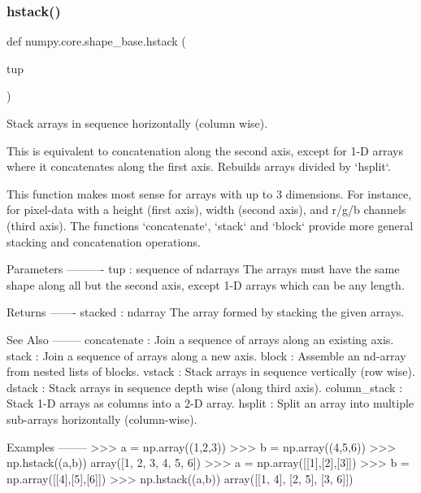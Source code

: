 \subsubsection{\texorpdfstring{hstack()}{hstack()}}
{\footnotesize\ttfamily def numpy.\+core.\+shape\+\_\+base.\+hstack (\begin{DoxyParamCaption}\item[{}]{tup }\end{DoxyParamCaption})}

\begin{DoxyVerb}Stack arrays in sequence horizontally (column wise).

This is equivalent to concatenation along the second axis, except for 1-D
arrays where it concatenates along the first axis. Rebuilds arrays divided
by `hsplit`.

This function makes most sense for arrays with up to 3 dimensions. For
instance, for pixel-data with a height (first axis), width (second axis),
and r/g/b channels (third axis). The functions `concatenate`, `stack` and
`block` provide more general stacking and concatenation operations.

Parameters
----------
tup : sequence of ndarrays
    The arrays must have the same shape along all but the second axis,
    except 1-D arrays which can be any length.

Returns
-------
stacked : ndarray
    The array formed by stacking the given arrays.

See Also
--------
concatenate : Join a sequence of arrays along an existing axis.
stack : Join a sequence of arrays along a new axis.
block : Assemble an nd-array from nested lists of blocks.
vstack : Stack arrays in sequence vertically (row wise).
dstack : Stack arrays in sequence depth wise (along third axis).
column_stack : Stack 1-D arrays as columns into a 2-D array.
hsplit : Split an array into multiple sub-arrays horizontally (column-wise).

Examples
--------
>>> a = np.array((1,2,3))
>>> b = np.array((4,5,6))
>>> np.hstack((a,b))
array([1, 2, 3, 4, 5, 6])
>>> a = np.array([[1],[2],[3]])
>>> b = np.array([[4],[5],[6]])
>>> np.hstack((a,b))
array([[1, 4],
       [2, 5],
       [3, 6]])\end{DoxyVerb}
 \mbox{\label{namespacenumpy_1_1core_1_1shape__base_a2ea357df147fbf13fd1cca339996ecda}} 
